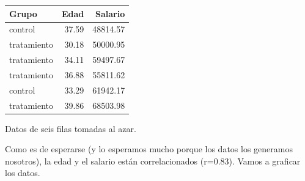 \documentclass[
  letterpaper,
  DIV=11,
  numbers=noendperiod,
  oneside]{scrreprt}
\begin{document}
\begin{table}
\fontsize{12.0pt}{14.4pt}\selectfont
\begin{tabular*}{\linewidth}{@{\extracolsep{\fill}}lrr}
\toprule
Grupo & Edad & Salario \\ 
\midrule\addlinespace[2.5pt]
control & 37.59 & 48814.57 \\ 
tratamiento & 30.18 & 50000.95 \\ 
tratamiento & 34.11 & 59497.67 \\ 
tratamiento & 36.88 & 55811.62 \\ 
control & 33.29 & 61942.17 \\ 
tratamiento & 39.86 & 68503.98 \\ 
\bottomrule
\end{tabular*}
\end{table}

Datos de seis filas tomadas al azar.

Como es de esperarse (y lo esperamos mucho porque los datos los
generamos nosotros), la edad y el salario están correlacionados
(r=0.83). Vamos a graficar los datos.
\end{document}

